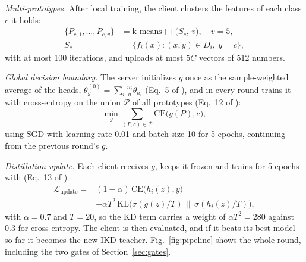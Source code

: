 \documentclass[conference]{IEEEtran}
\begin{document}
\textit{Multi-prototypes.} After local training, the client clusters the features of each class $c$ it holds:
\begin{equation}
\begin{split}
\{P_{c,1},\dots,P_{c,v}\} &= \text{k-means++}\big(S_c,\, v\big),\quad v=5,\\
S_c &= \{f_i(x) : (x,y)\in D_i,\ y=c\},
\end{split}
\label{eq:protos}
\end{equation}
with at most 100 iterations, and uploads at most $5C$ vectors of 512 numbers.

\textit{Global decision boundary.} The server initializes $g$ once as the sample-weighted average of the heads, $\theta_g^{(0)}=\sum_i \frac{n_i}{n}\theta_{h_i}$ (Eq.~5 of \cite{zhang2025gdbd}), and in every round trains it with cross-entropy on the union $\mathcal{P}$ of all prototypes (Eq.~12 of \cite{zhang2025gdbd}):
\begin{equation}
\min_{g} \sum_{(P,c)\in\mathcal{P}} \mathrm{CE}\big(g(P), c\big),
\label{eq:gtrain}
\end{equation}
using SGD with learning rate 0.01 and batch size 10 for 5 epochs, continuing from the previous round's $g$.

\textit{Distillation update.} Each client receives $g$, keeps it frozen and trains for 5 epochs with (Eq.~13 of \cite{zhang2025gdbd})
\begin{equation}
\begin{split}
\mathcal{L}_{\text{update}} = {}&(1-\alpha)\,\mathrm{CE}\big(h_i(z),y\big)\\
&+ \alpha T^2\,\mathrm{KL}\big(\sigma(g(z)/T)\,\big\|\,\sigma(h_i(z)/T)\big),
\end{split}
\label{eq:update}
\end{equation}
with $\alpha=0.7$ and $T=20$, so the KD term carries a weight of $\alpha T^2=280$ against $0.3$ for cross-entropy. The client is then evaluated, and if it beats its best model so far it becomes the new IKD teacher. Fig.~\ref{fig:pipeline} shows the whole round, including the two gates of Section~\ref{sec:gates}.
\end{document}
